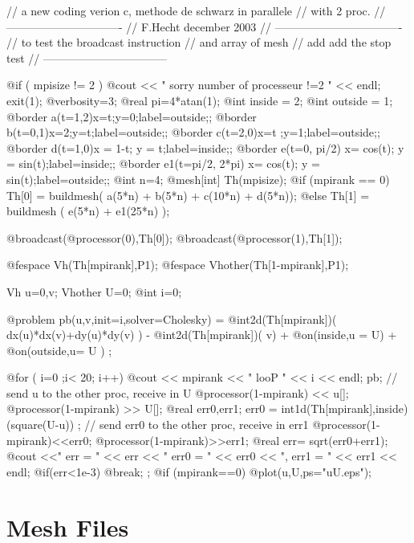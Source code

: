 \documentclass[twoside]{book}
\def\Bool{\texttt{bool}}
\def\Real{\texttt{real}}
\def\Int{\texttt{int}}
\begin{document}
\bFF
//  a new coding verion c,   methode de schwarz in parallele \hfilll
// with 2 proc. \hfilll
//  ------------------------------- \hfilll
// F.Hecht december 2003 \hfilll
// ---------------------------------- \hfilll
//  to test the broadcast instruction \hfilll
//  and array of mesh  \hfilll
//  add add the stop test \hfilll
//  --------------------------------- \hfilll

@if ( mpisize != 2 ) {
  @cout << " sorry number of processeur !=2 " << endl;
  exit(1);}
@verbosity=3;
@real pi=4*atan(1);
@int inside = 2;
@int outside = 1;
@border a(t=1,2){x=t;y=0;label=outside;};
@border b(t=0,1){x=2;y=t;label=outside;};
@border c(t=2,0){x=t ;y=1;label=outside;};
@border d(t=1,0){x = 1-t; y = t;label=inside;};
@border e(t=0, pi/2){ x= cos(t); y = sin(t);label=inside;};
@border e1(t=pi/2, 2*pi){ x= cos(t); y = sin(t);label=outside;}; 
@int n=4;
@mesh[int]  Th(mpisize);
@if (mpirank == 0) 
 Th[0] = buildmesh( a(5*n) + b(5*n) + c(10*n) + d(5*n));
@else
 Th[1] = buildmesh ( e(5*n) + e1(25*n) );

@broadcast(@processor(0),Th[0]);
@broadcast(@processor(1),Th[1]);

@fespace Vh(Th[mpirank],P1);
@fespace Vhother(Th[1-mpirank],P1);

Vh u=0,v;
Vhother U=0;
@int i=0;

@problem pb(u,v,init=i,solver=Cholesky) = 
    @int2d(Th[mpirank])( dx(u)*dx(v)+dy(u)*dy(v) )
  - @int2d(Th[mpirank])( v) 
  + @on(inside,u = U)  +  @on(outside,u= U ) ;

@for ( i=0 ;i< 20; i++) 
{ 
  @cout << mpirank << " looP " << i << endl;
   pb; 
   //  send u  to the other proc, receive in U
   @processor(1-mpirank) << u[];   @processor(1-mpirank) >> U[];
   @real err0,err1;
   err0 = int1d(Th[mpirank],inside)(square(U-u)) ;
   // send err0  to the other proc, receive in err1
   @processor(1-mpirank)<<err0;   @processor(1-mpirank)>>err1;
   @real err= sqrt(err0+err1);
   @cout <<" err = " << err << " err0 = " << err0 << ", err1 = " << err1 << endl;
   @if(err<1e-3) @break;
};
@if (mpirank==0)  
    @plot(u,U,ps="uU.eps");

\eFF



\section{ Mesh Files}
 \def\Chars#1{{\tt (C*)}  #1}
 \def\Char#1{{\tt (C)}  #1}
 \def\Int#1{ {\tt(I)} #1}
 \def\Real#1{{\tt(R)} #1}
 \def\Bool#1{{\tt(B)} #1}
 \def\Vertex#1{{{\tt @@Vertex}#1}}
 \def\Edge#1{{{\tt @@Edge}#1}}
 \def\Triangle#1{{{\tt @@Tria}#1}}
 \def\Quadrangle#1{{{\tt @@Quad}#1}}
 \def\Tetrahedron#1{{{\tt @@Tetra}#1}}
 \def\Hexahedron#1{{{\tt @@Hexa}#1}}
 \def\Pentahedron#1{{{\tt @@Penta}#1}}
 \def\Loop#1#2{{\bf\Large(}\,#1\,{\bf\Large{,\,\,}}\,#2\,{\bf\Large)}}
 \def\requis{\hfill {\it  requis}}
 \def\facultatif{\quad\quad facultatif}
 \def\need#1{\hfill{\it  requiert le champ\,:\,#1}}
\end{document}
